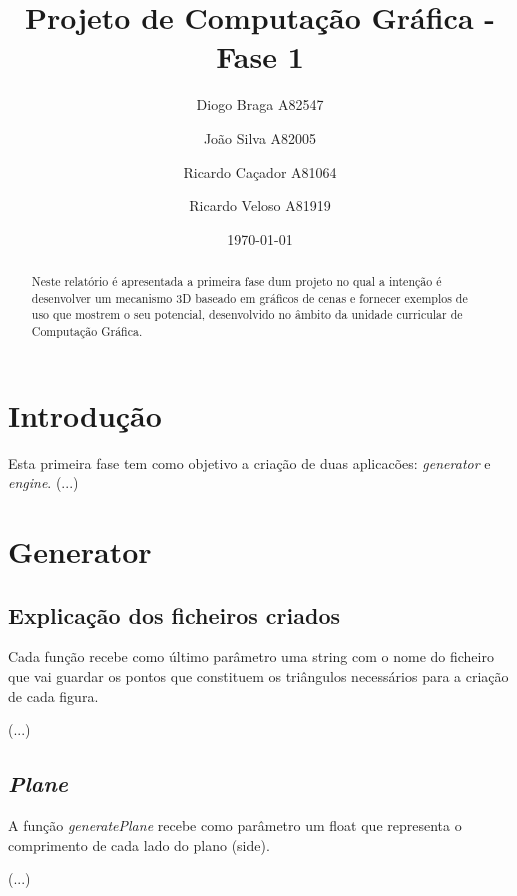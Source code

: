 \documentclass[a4paper]{article}
\title{Projeto de Computação Gráfica - Fase 1}
\author{Diogo Braga A82547 \and João Silva A82005 \and Ricardo Caçador A81064
\and Ricardo Veloso A81919}
\date{\today}
\begin{document}
\maketitle

\begin{abstract}
Neste relatório é apresentada a primeira fase dum projeto no qual a intenção é desenvolver um mecanismo 3D baseado em gráficos de cenas e fornecer exemplos de uso que mostrem o seu potencial, desenvolvido no âmbito da unidade curricular de Computação Gráfica.
\end{abstract}

\tableofcontents

\newpage


\section{Introdução}
\label{sec:intro}

Esta primeira fase tem como objetivo a criação de duas aplicacões: \textit{generator} e \textit{engine}.
(...)

\section{Generator}
\label{sec:generator}

\subsection{Explicação dos ficheiros criados}
\label{sec:ficheiros}

Cada função recebe como último parâmetro uma string com o nome do ficheiro que vai guardar os pontos que constituem os triângulos necessários para a criação de cada figura.

(...)

\subsection{\textit{Plane}}
\label{sec:plane}
A função \textit{generatePlane} recebe como parâmetro um float que representa o comprimento de cada lado do plano (side).

(...)
\end{document}
